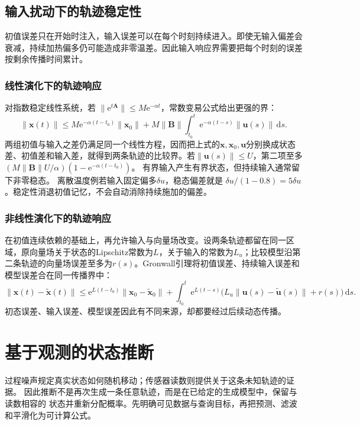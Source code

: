 \subsection{输入扰动下的轨迹稳定性}
初值误差只在开始时注入，输入误差可以在每个时刻持续进入。即使无输入偏差会衰减，持续加热偏多仍可能造成非零温差。因此输入响应界需要把每个时刻的误差按剩余传播时间累计。

\subsubsection{线性演化下的轨迹响应}
对指数稳定线性系统，若
$\|\mathrm e^{t\bm A}\|\leq M\mathrm e^{-\alpha t}$，常数变易公式给出更强的界：
\[
  \|\bm x(t)\|
  \leq M\mathrm e^{-\alpha(t-t_0)}\|\bm x_0\|
  +M\|\bm B\|\int_{t_0}^t\mathrm e^{-\alpha(t-s)}\|\bm u(s)\|\,\mathrm ds.
\]
两组初值与输入之差仍满足同一个线性方程，因而把上式的$\bm x,\bm x_0,\bm u$分别换成状态差、初值差和输入差，就得到两条轨迹的比较界。若$\|\bm u(s)\|\leq U$，第二项至多
$(M\|\bm B\|U/\alpha)(1-\mathrm e^{-\alpha(t-t_0)})$。
有界输入产生有界状态，但持续输入通常留下非零稳态。
离散温度例若输入固定偏多$\delta u$，稳态偏差就是
$\delta u/(1-0.8)=5\delta u$。稳定性消退初值记忆，不会自动消除持续施加的偏差。

\subsubsection{非线性演化下的轨迹响应}
在初值连续依赖的基础上，再允许输入与向量场改变。设两条轨迹都留在同一区域，原向量场关于状态的Lipschitz常数为$L$，关于输入的常数为$L_u$；比较模型沿第二条轨迹的向量场误差至多为$r(s)$。Gronwall引理将初值误差、持续输入误差和模型误差合在同一传播界中：
\[
  \|\bm x(t)-\widetilde{\bm x}(t)\|
  \leq \mathrm e^{L(t-t_0)}\|\bm x_0-\widetilde{\bm x}_0\|
  +\int_{t_0}^t\mathrm e^{L(t-s)}
     \bigl(L_u\|\bm u(s)-\widetilde{\bm u}(s)\|+r(s)\bigr)\,\mathrm ds.
\]
初态误差、输入误差、模型误差因此有不同来源，却都要经过后续动态传播。

\section{基于观测的状态推断}
\label{sec:dynamical-state-space-filtering}
\label{sec:dynamical-stochastic-state-observation}

过程噪声规定真实状态如何随机移动；传感器读数则提供关于这条未知轨迹的证据。
因此推断不是再次生成一条任意轨迹，而是在已给定的生成模型中，保留与读数相容的
状态并重新分配概率。先明确可见数据与查询目标，再把预测、滤波和平滑化为可计算公式。

